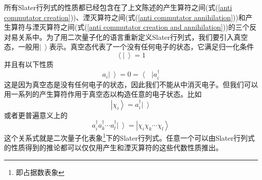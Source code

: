 \documentclass[12pt,a4paper,openany,twoside]{book}
\numberwithin{equation}{section}
\begin{document}
      所有Slater行列式的性质都已经包含在了上文陈述的产生算符之间(式(\ref{anti commutator creation}))、湮灭算符之间(式(\ref{anti commutator annihilation}))和产生算符与湮灭算符之间(式(\ref{anti commutator creation and annihilation}))的三个反对易关系中。为了用二次量子化的语言重新定义Slater行列式，我们要引入真空态，一般用$\left|\ \right\rangle$表示。真空态代表了一个没有任何电子的状态，它满足归一化条件
      \begin{equation}
          \left\langle\right.\left|\ \right\rangle=1
      \end{equation}
      并且有以下性质
      \begin{equation}
          a_i\left|\ \right\rangle=0=\left\langle\text{\  }\right|a_i^\dagger
      \end{equation}
      这是因为真空态是没有任何电子的状态，因此我们不能从中消灭电子。但我们可以用一系列的产生算符作用于真空态以构造任意的电子状态。比如
      \begin{equation}
          \left|\chi_i\right\rangle=a_i^\dagger\left|\ \right\rangle
      \end{equation}
      或者更普遍意义上的
      \begin{equation}
          a_i^\dagger a_k^\dagger\cdots a_l^\dagger\left|\ \right\rangle=\left|\chi_i
          \chi_k\cdots\chi_l\right\rangle
      \end{equation}
      这个关系式就是二次量子化表象\footnote{即占据数表象}下的Slater行列式。任意一个可以由Slater行列式的性质得到的推论都可以仅仅用产生和湮灭算符的这些代数性质推出。
      
\end{document}
